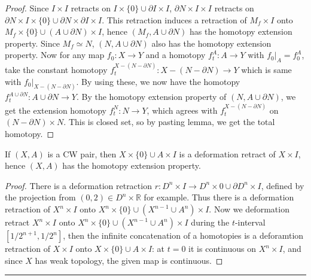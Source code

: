 \begin{proof} Since $I\times I$ retracts on $I\times \{0\}\cup \partial I\times I$, $\partial N\times I\times I$ retracts on $\partial N\times I\times\{0\}\cup \partial N\times \partial I\times I$. This retraction induces a retraction of $M_f\times I$ onto $M_f\times \{0\}\cup(A\cup \partial N)\times I$, hence $(M_f,A\cup \partial N)$ has the homotopy extension property. Since $M_f\simeq N$, $(N,A\cup \partial N)$ also has the homotopy extension property. Now for any map $f_0:X\rightarrow Y$ and a homotopy $f_t^A:A\rightarrow Y$ with $f_0|_A = f_0^A$, take the constant homotopy $f_t^{X-(N-\partial N)}:X-(N-\partial N)\rightarrow Y$ which is same with $f_0|_{X-(N-\partial N)}$. By using these, we now have the homotopy $f_t^{A\cup \partial N}:A\cup \partial N\rightarrow Y$. By the homotopy extension property of $(N,A\cup \partial N)$, we get the extension homotopy $f_t^{N}:N\rightarrow Y$, which agrees with $f_t^{X-(N-\partial N)}$ on $(N-\partial N)\times N$. This is closed set, so by pasting lemma, we get the total homotopy.
\end{proof}
\begin{prop} If $(X,A)$ is a CW pair, then $X\times \{0\}\cup A\times I$ is a deformation retract of $X\times I$, hence $(X,A)$ has the homotopy extension property.
\end{prop}
\begin{proof} There is a deformation retraction $r:D^n\times I \rightarrow D^n\times {0}\cup \partial D^n\times I$, defined by the projection from $(0,2)\in D^n\times \mathbb{R}$ for example. Thus there is a deformation retraction of $X^n\times I$ onto $X^n\times \{0\}\cup (X^{n-1}\cup A^n)\times I$. Now we deformation retract $X^n\times I$ onto $X^{n}\times \{0\}\cup (X^{n-1}\cup A^n)\times I$ during the $t$-interval $[1/2^{n+1},1/2^n]$, then the infinite concatenation of a homotopies is a deforamtion retraction of $X\times I$ onto $X\times\{0\}\cup A\times I$: at $t=0$ it is continuous on $X^n\times I$, and since $X$ has weak topology, the given map is continuous.
\end{proof}
\noindent\rule{\textwidth}{1pt}
\newline